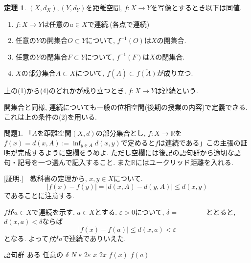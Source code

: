 \documentclass[dvipdfmx,a4paper,11pt]{article}
\newcommand{\R}{\mathbb{R}}
\theoremstyle{definition}
\newtheorem{thm}{定理}
\begin{document}
 \begin{tcolorbox}[
    colback = white,
    colframe = black!35!black,
    fonttitle = \bfseries,
    breakable = true]
    \begin{thm}
    $(X, d_X), (Y, d_Y)$を距離空間, $f : X \to Y$を写像とするとき以下は同値.
\begin{enumerate}[label=(\arabic*).]
    \setlength{\parskip}{0cm} 
  \setlength{\itemsep}{0cm} 
    \item $f :X \to Y$は任意の$a \in X$で連続.(各点で連続)
    \item 任意の$Y$の開集合$O\subset Y$について, $f^{-1}(O)$は$X$の開集合.
     \item 任意の$Y$の閉集合$F\subset Y$について, $f^{-1}(F)$は$X$の閉集合.
    \item $X$の部分集合$A \subset X$について, $f(\overline{A}) \subset \overline{f(A)}$が成り立つ. 
    \end{enumerate}
        \end{thm}
        上の(1)から(4)のどれかが成り立つとき, $f : X \to Y$は連続という. 
 \end{tcolorbox}
 開集合と同様, 連続についても一般の位相空間(後期の授業の内容)で定義できる.
 これは上の条件の(2)を用いる.
 
 \medskip

 
 問題1. 「$A$を距離空間$(X, d)$の部分集合とし, $f : X \rightarrow \R$を$f(x) =d(x,A):= \inf_{y \in A} d(x,y)$で定めると$f$は連続である」この主張の証明が完成するように空欄をうめよ. ただし空欄には後記の語句群から適切な語句・記号を一つ選んで記入すること.
また$\R$にはユークリッド距離を入れる. 

 [証明.]　教科書の定理から, $x, y \in X$について. 
$$
|f(x)-f(y)|=
 |d(x, A)-d(y, A)| \le d(x,y)
 $$
 であることに注意する.
 
$f$が\boxed{\phantom{hogehoge}}$a \in X$で連続を示す. 
$a \in X$とする. 
\boxed{\phantom{hogehoge}}$\varepsilon >0$について, $\delta=\boxed{\phantom{hogehoge}}$ととると, $d(x, a)<\delta$ならば
$$|f(x) - f(a)|\le d(x, a) < \varepsilon
$$
となる. よって$f$が$a $で連続でありいえた. 


  \begin{itembox}[l]{語句群}
ある \quad 任意の \quad  $\delta$ \quad $N$ \quad $\varepsilon$ \quad $2 \varepsilon$  \quad $x$ \quad $2x$ \quad $f(x)$ \quad $f(a)$
\end{itembox}

\end{document}

